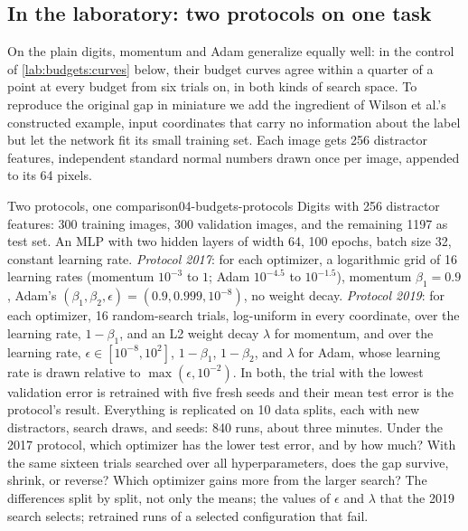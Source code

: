 \begin{refsection}
\section{In the laboratory: two protocols on one task}\label{sec:budgets:lab}

On the plain digits, momentum and Adam generalize equally well: in the control of \cref{lab:budgets:curves} below, their budget curves agree within a quarter of a point at every budget from six trials on, in both kinds of search space. To reproduce the original gap in miniature we add the ingredient of Wilson et al.'s constructed example, input coordinates that carry no information about the label but let the network fit its small training set. Each image gets 256 distractor features, independent standard normal numbers drawn once per image, appended to its 64 pixels.

\begin{lab}{Two protocols, one comparison}{04-budgets-protocols}\label{lab:budgets:protocols}
 Digits with 256 distractor features: 300 training images, 300 validation images, and the remaining 1197 as test set. An MLP with two hidden layers of width 64, 100 epochs, batch size 32, constant learning rate. \emph{Protocol 2017}: for each optimizer, a logarithmic grid of 16 learning rates (momentum $10^{-3}$ to $1$; Adam $10^{-4.5}$ to $10^{-1.5}$), momentum $\beta_1=0.9$, Adam's $(\beta_1,\beta_2,\epsilon)=(0.9,0.999,10^{-8})$, no weight decay. \emph{Protocol 2019}: for each optimizer, 16 random-search trials, log-uniform in every coordinate, over the learning rate, $1-\beta_1$, and an L2 weight decay $\lambda$ for momentum, and over the learning rate, $\epsilon\in[10^{-8},10^2]$, $1-\beta_1$, $1-\beta_2$, and $\lambda$ for Adam, whose learning rate is drawn relative to $\max(\epsilon,10^{-2})$. In both, the trial with the lowest validation error is retrained with five fresh seeds and their mean test error is the protocol's result. Everything is replicated on 10 data splits, each with new distractors, search draws, and seeds: 840 runs, about three minutes.
 Under the 2017 protocol, which optimizer has the lower test error, and by how much? With the same sixteen trials searched over all hyperparameters, does the gap survive, shrink, or reverse? Which optimizer gains more from the larger search?
 The differences split by split, not only the means; the values of $\epsilon$ and $\lambda$ that the 2019 search selects; retrained runs of a selected configuration that fail.
\end{lab}


\end{refsection}
